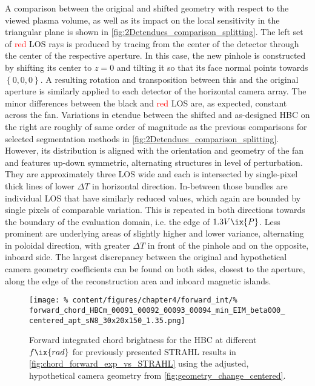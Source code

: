 %
            A comparison between the original and shifted geometry with respect to the viewed plasma volume, as well as its impact on the local sensitivity in the triangular plane is shown in \cref{fig:2Detendues_comparison_splitting}. The left set of \textcolor{red}{red} LOS rays is produced by tracing from the center of the detector through the center of the respective aperture. In this case, the new pinhole is constructed by shifting its center to $z=0$ and tilting it so that its face normal points towards $\left\{0, 0, 0\right\}$. A resulting rotation and transposition between this and the original aperture is similarly applied to each detector of the horizontal camera array. The minor differences between the black and \textcolor{red}{red} LOS are, as expected, constant across the fan. Variations in etendue between the shifted and as-designed HBC on the right are roughly of same order of magnitude as the previous comparisons for selected segmentation methods in \cref{fig:2Detendues_comparison_splitting}.  However, its distribution is aligned with the orientation and geometry of the fan and features up-down symmetric, alternating structures in level of perturbation. They are approximately three LOS wide and each is intersected by single-pixel thick lines of lower $\Delta T$
            in horizontal direction. In-between those bundles are individual LOS that have similarly reduced values, which again are bounded by single pixels of comparable variation. This is repeated in both directions towards the boundary of the evaluation domain, i.e. the edge of $1.3V\ix{P}$. Less prominent are underlying areas of slightly higher and lower variance, alternating in poloidal direction, with greater $\Delta T$ in front of the pinhole and on the opposite, inboard side. The largest discrepancy between the original and hypothetical camera geometry coefficients can be found on both sides, closest to the aperture, along the edge of the reconstruction area and inboard magnetic islands.\\%
%
            \begin{figure}[t]%
                \centering%
                \texttt{[image: \%
                    content/figures/chapter4/forward\_int/\%
                    forward\_chord\_HBCm\_00091\_00092\_00093\_00094\_min\_EIM\_beta000\_centered\_apt\_sN8\_30x20x150\_1.35.png]}%
                \caption{Forward integrated chord brightness for the HBC at different $f\ix{rad}$ for previously presented STRAHL results in \cref{fig:chord_forward_exp_vs_STRAHL} using the adjusted, hypothetical camera geometry from \cref{fig:geometry_change_centered}.}\label{fig:forward_intSTRAHL_centered}%
            \end{figure}%
